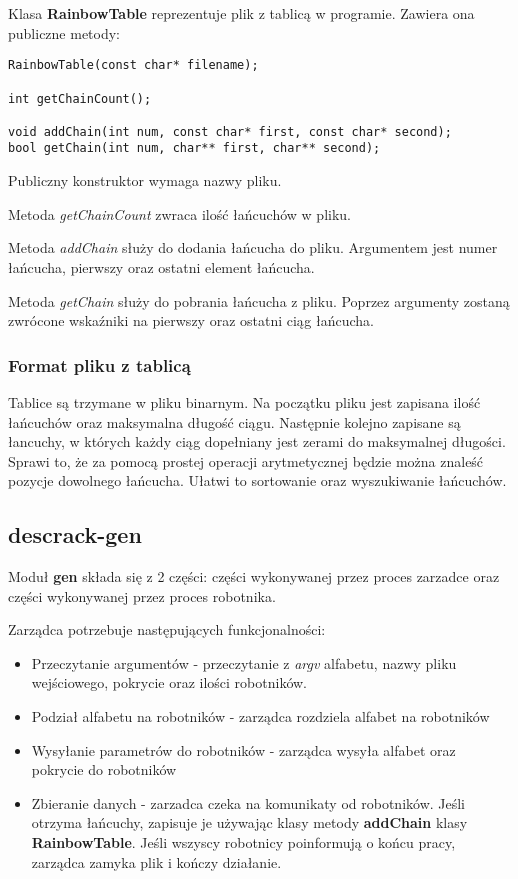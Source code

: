 \documentclass[a4paper,11pt]{article}
\begin{document}
Klasa \textbf{RainbowTable} reprezentuje plik z tablicą w programie. Zawiera ona publiczne metody:

\begin{lstlisting}
RainbowTable(const char* filename);

int getChainCount();

void addChain(int num, const char* first, const char* second);
bool getChain(int num, char** first, char** second);
\end{lstlisting}

Publiczny konstruktor wymaga nazwy pliku.

Metoda \emph{getChainCount} zwraca ilość łańcuchów w pliku.

Metoda \emph{addChain} służy do dodania łańcucha do pliku. Argumentem jest numer łańcucha, pierwszy oraz ostatni element łańcucha.

Metoda \emph{getChain} służy do pobrania łańcucha z pliku. Poprzez argumenty zostaną zwrócone wskaźniki na pierwszy oraz ostatni ciąg łańcucha.

\subsubsection{Format pliku z tablicą}

Tablice są trzymane w pliku binarnym. Na początku pliku jest zapisana ilość łańcuchów oraz maksymalna długość ciągu. Następnie kolejno zapisane są łancuchy, w których każdy ciąg dopełniany jest zerami do maksymalnej długości. Sprawi to, że za pomocą prostej operacji arytmetycznej będzie można znaleść pozycje dowolnego łańcucha. Ułatwi to sortowanie oraz wyszukiwanie łańcuchów.

\subsection{descrack-gen}

Moduł \textbf{gen} składa się z 2 części: części wykonywanej przez proces zarzadce oraz części wykonywanej przez proces robotnika.

Zarządca potrzebuje następujących funkcjonalności:
\begin{itemize}
	\item Przeczytanie argumentów - przeczytanie z \emph{argv} alfabetu, nazwy pliku wejściowego, pokrycie oraz ilości robotników.
	\item Podział alfabetu na robotników - zarządca rozdziela alfabet na robotników
	\item Wysyłanie parametrów do robotników - zarządca wysyła alfabet oraz pokrycie do robotników
	\item Zbieranie danych - zarzadca czeka na komunikaty od robotników. Jeśli otrzyma łańcuchy, zapisuje je używając klasy metody \textbf{addChain} klasy \textbf{RainbowTable}. Jeśli wszyscy robotnicy poinformują o końcu pracy, zarządca zamyka plik i kończy działanie.
\end{itemize}
\end{document}
